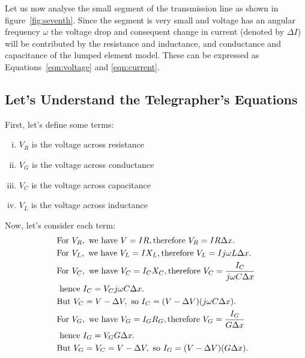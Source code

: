 Let us now analyse the small segment of the transmission line as shown in figure~\ref{fig:seventh}. Since the segment is very small and voltage has an angular frequency $ \omega $ the voltage drop and consequent change in current (denoted by $\Delta I$) will be contributed by the resistance and inductance, and conductance and capacitance of the lumped element model. These can be expressed as Equations~\eqref{eqn:voltage} and \eqref{eqn:current}.


\subsection{Let's Understand the Telegrapher's Equations}
First, let's define some terms:
\begin{enumerate}[(i)]
\item \(V_{R}\) is the voltage across resistance
\item \(V_{G}\) is the voltage across conductance
\item \(V_{C}\) is the voltage across capacitance
\item \(V_{L}\) is the voltage across inductance
\end{enumerate}

Now, let's consider each term:
\begin{align*}
&\text{For } V_{R}, \text{ we have } V = IR, \text{ 
\newline
therefore } V_{R} = IR \Delta x.\\
&\text{For } V_{L}, \text{ we have } V_{L} = IX_{L}, \text{ 
\newline therefore } V_{L} = Ij\omega L \Delta x.\\
&\text{For } V_{C}, \text{ we have } V_{C} = I_{C}X_{C}, \text{ 
\newline therefore } V_{C} = \frac{I_{C}}{j\omega C \Delta x}\\
\newline &\text{ hence } I_{C} = V_{C}j\omega C \Delta x.\\
&\text{But } V_{C} = V - \Delta V, \text{ so } I_{C} = (V - \Delta V)(j\omega C \Delta x).\\
&\text{For } V_{G}, \text{ we have } V_{G} = I_{G}R_{G}, \text{ 
\newline therefore } V_{G} = \frac{I_{G}}{G \Delta x}\\
\newline &\text{ hence } I_{G} = V_{G}G \Delta x.\\
&\text{But } V_{G} = V_{C} = V - \Delta V, \text{ so } I_{G} = (V - \Delta V)(G \Delta x).
\end{align*}

